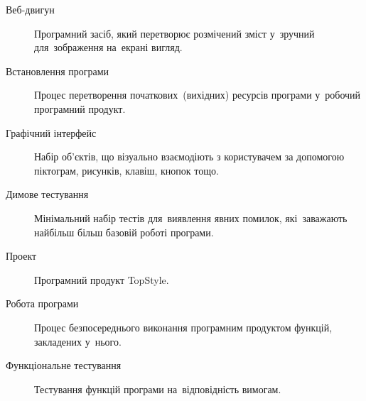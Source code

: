 \documentclass[a4paper,oneside,BCOR=1cm,DIV=12,12pt,headings=normal]{scrartcl}
\newlength{\modulewidth}
\begin{document}

				\begin{description}
					\item [Веб-двигун] Програмний засіб, який перетворює розмічений зміст у~зручний для~зображення на~екрані вигляд.

					\item [Встановлення програми] Процес перетворення початкових~(вихідних) ресурсів програми у~робочий програмний продукт.

					\item [Графічний інтерфейс] Набір об'єктів, що візуально взаємодіють з користувачем за допомогою піктограм, рисунків, клавіш, кнопок тощо.

					\item [Димове тестування] Мінімальний набір тестів для~виявлення явних помилок, які~заважають найбільш більш базовій роботі програми.

					\item [Проект] Програмний продукт TopStyle.

					\item [Робота програми] Процес безпосереднього виконання програмним продуктом функцій, закладених у~нього.

					\item [Функціональне тестування] Тестування функцій програми на~відповідність вимогам.
				\end{description}
\end{document}

